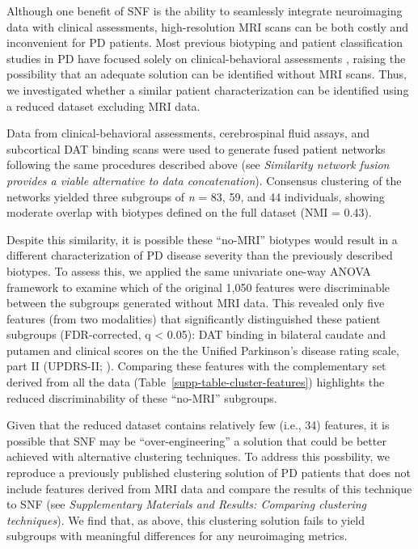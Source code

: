 \documentclass[12pt,aps,pra,reprint,showkeys]{revtex4-1}
\begin{document}
Although one benefit of SNF is the ability to seamlessly integrate neuroimaging data with clinical assessments, high-resolution MRI scans can be both costly and inconvenient for PD patients.
Most previous biotyping and patient classification studies in PD have focused solely on clinical-behavioral assessments \citep{fereshtehnejad2017clinical, faghri2018predicting}, raising the possibility that an adequate solution can be identified without MRI scans.
Thus, we investigated whether a similar patient characterization can be identified using a reduced dataset excluding MRI data.

Data from clinical-behavioral assessments, cerebrospinal fluid assays, and subcortical DAT binding scans were used to generate fused patient networks following the same procedures described above (see \textit{Similarity network fusion provides a viable alternative to data concatenation}).
Consensus clustering of the networks yielded three subgroups of \emph{n} = 83, 59, and 44 individuals, showing moderate overlap with biotypes defined on the full dataset (NMI = 0.43).

Despite this similarity, it is possible these ``no-MRI'' biotypes would result in a different characterization of PD disease severity than the previously described biotypes.
To assess this, we applied the same univariate one-way ANOVA framework to examine which of the original 1,050 features were discriminable between the subgroups generated without MRI data.
This revealed only five features (from two modalities) that significantly distinguished these patient subgroups (FDR-corrected, q < 0.05): DAT binding in bilateral caudate and putamen and clinical scores on the the Unified Parkinson's disease rating scale, part II (UPDRS-II; \citep{goetz2008movement}).
Comparing these features with the complementary set derived from all the data (Table~\ref{supp-table-cluster-features}) highlights the reduced discriminability of these ``no-MRI'' subgroups.

Given that the reduced dataset contains relatively few (i.e., 34) features, it is possible that SNF may be ``over-engineering'' a solution that could be better achieved with alternative clustering techniques.
To address this possbility, we reproduce a previously published clustering solution of PD patients that does not include features derived from MRI data and compare the results of this technique to SNF (see \textit{Supplementary Materials and Results: Comparing clustering techniques}).
We find that, as above, this clustering solution fails to yield subgroups with meaningful differences for any neuroimaging metrics.
\end{document}
